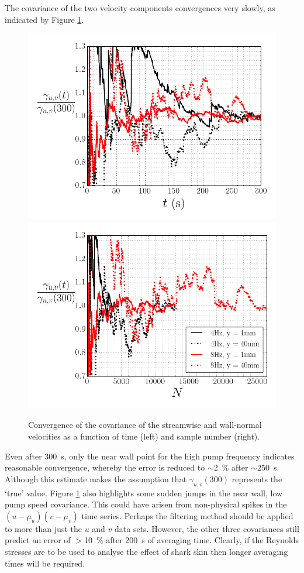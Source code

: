 \documentclass[12pt,oneside,a4paper]{article}
\begin{document}
The covariance of the two velocity components convergences very slowly, as indicated by Figure \ref{figure:experiments:timeDependence:uv}.
%
\begin{figure}[!b]
\centering
\includegraphics[width=0.5\linewidth]{images/LDA_timeDependenceImages/uvTConvergence.png}\hfill
\includegraphics[width=0.5\linewidth]{images/LDA_timeDependenceImages/uvNConvergence.png}\\
\caption{Convergence of the covariance of the streamwise and wall-normal velocities as a function of time (left) and sample number (right).}
\label{figure:experiments:timeDependence:uv}
\end{figure}
%
Even after \SI{300}{s}, only the near wall point for the high pump frequency indicates reasonable convergence, whereby the error is reduced to $\sim$\SI{2}{\%} after $\sim$\SI{250}{s}. Although this estimate makes the assumption that $\gamma_{u,v}(300)$ represents the `true' value. Figure \ref{figure:experiments:timeDependence:uv} also highlights some sudden jumps in the near wall, low pump speed covariance. This could have arisen from non-physical spikes in the $(u-\mu_u)(v-\mu_v)$ time series. Perhaps the filtering method should be applied to more than just the $u$ and $v$ data sets. However, the other three covariances still predict an error of $>$\SI{10}{\%} after \SI{200}{s} of averaging time. Clearly, if the Reynolds stresses are to be used to analyse the effect of shark skin then longer averaging times will be required. 
\end{document}
